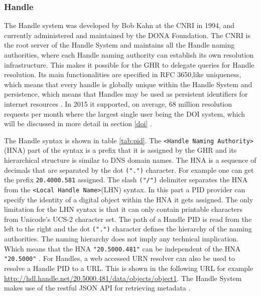 \subsubsection{Handle}\label{hndl}
The Handle system was developed by Bob Kahn at the CNRI in 1994, and currently administered and maintained by the DONA Foundation. The CNRI is the root server of the Handle System and maintains all the Handle naming authorities, where each Handle naming authority can establish its own resolution infrastructure. This makes it possible for the GHR to delegate queries for Handle resolution. 
Its main functionalities are specified in RFC 3650,like uniqueness, which means that every handle is globally unique within the Handle System and persistence, which means that Handles may be used as persistent identifiers for internet resources \cite{rfc3650}. In 2015 it supported, on average, 68 million resolution requests per month where the largest single user being the DOI system, which will be discussed in more detail in section \ref{doi} \cite{hdl-us}. 

The Handle syntax is shown in table \ref{tab:pid}. The \texttt{\textless Handle Naming Authority\textgreater} (HNA) part of the syntax is a prefix that it is assigned by the GHR and its hierarchical structure is similar to DNS domain names. The HNA is a sequence of decimals that are separated by the dot \texttt{(".")} character. For example one can get the prefix \texttt{20.4000.581} assigned. The slash \texttt{("/")} delimiter separates the HNA from the \texttt{\textless Local Handle Name\textgreater}(LHN) syntax. In this part a PID provider can specify the identity of a digital object within the HNA it gets assigned. The only limitation for the LHN syntax is that it can only contain printable characters from Unicode's UCS-2 character set. The path of a Handle PID is read from the left to the right and the dot \texttt{(".")} character defines the hierarchy of the naming authorities. The naming hierarchy does not imply any technical implication. Which means that the HNA \texttt{"20.5000.481"} can be independent of the HNA \texttt{"20.5000"} \cite{icn-bd}. For Handles, a web accessed URN resolver can also be used to resolve a Handle PID to a URL. This is shown in the following URL for example \url{http://hdl.handle.net/20.5000.481/data/objects/object1}. The Handle System makes use of the restful JSON API for retrieving metadata \cite{hdl-api}.


